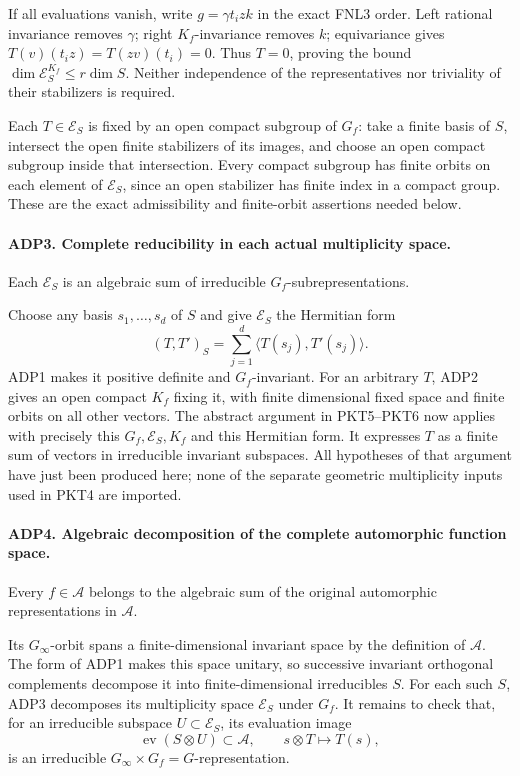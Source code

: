 \documentclass[11pt,a4paper]{article}
\numberwithin{equation}{section}
\theoremstyle{remark}\newtheorem{remark}[theorem]{Remark}
\begin{document}
If all evaluations vanish, write \(g=\gamma t_i z k\) in the exact
FNL3 order.  Left rational invariance removes \(\gamma\); right
\(K_f\)-invariance removes \(k\); equivariance gives
\(T(v)(t_i z)=T(zv)(t_i)=0\).  Thus \(T=0\), proving the bound
\(\dim\mathcal E_S^{K_f}\le r\dim S\).  Neither independence of the
representatives nor triviality of their stabilizers is required.

Each \(T\in\mathcal E_S\) is fixed by an open compact subgroup of
\(G_f\): take a finite basis of \(S\), intersect the open finite
stabilizers of its images, and choose an open compact subgroup inside
that intersection.  Every compact subgroup has finite orbits on each
element of \(\mathcal E_S\), since an open stabilizer has finite
index in a compact group.  These are the exact admissibility and
finite-orbit assertions needed below.

\paragraph{ADP3. Complete reducibility in each actual multiplicity space.}
\label{claim:ADP3}
Each \(\mathcal E_S\) is an algebraic sum of irreducible
\(G_f\)-subrepresentations.

Choose any basis \(s_1,\ldots,s_d\) of \(S\) and give
\(\mathcal E_S\) the Hermitian form
\[
       (T,T')_S=\sum_{j=1}^d
                         \langle T(s_j),T'(s_j)\rangle.
\]
ADP1 makes it positive definite and \(G_f\)-invariant.  For an arbitrary
\(T\), ADP2 gives an open compact \(K_f\) fixing it, with finite
dimensional fixed space and finite orbits on all other vectors.  The
abstract argument in PKT5--PKT6 now applies with precisely this
\(G_f,\mathcal E_S,K_f\) and this Hermitian form.  It expresses
\(T\) as a finite sum of vectors in irreducible invariant subspaces.
All hypotheses of that argument have just been produced here; none of
the separate geometric multiplicity inputs used in PKT4 are imported.

\paragraph{ADP4. Algebraic decomposition of the complete automorphic function space.}
\label{claim:ADP4}
Every \(f\in\mathcal A\) belongs to the algebraic sum of the original
automorphic representations in \(\mathcal A\).

Its \(G_\infty\)-orbit spans a finite-dimensional invariant space by
the definition of \(\mathcal A\).  The form of ADP1 makes this space
unitary, so successive invariant orthogonal complements decompose it
into finite-dimensional irreducibles \(S\).  For each such \(S\),
ADP3 decomposes its multiplicity space \(\mathcal E_S\) under \(G_f\).
It remains to check that, for an irreducible subspace
\(U\subset\mathcal E_S\), its evaluation image
\[
       \operatorname{ev}(S\otimes U)\subset\mathcal A,
          \qquad s\otimes T\longmapsto T(s),
\]
is an irreducible \(G_\infty\times G_f=G\)-representation.
\end{document}
